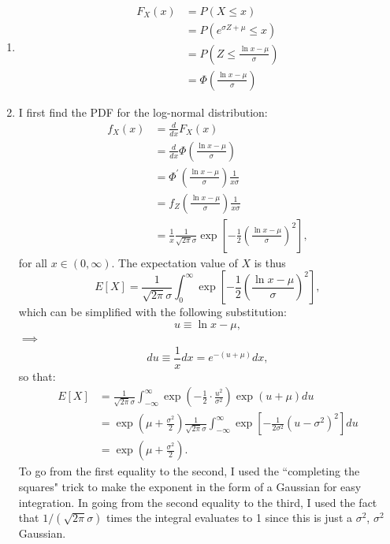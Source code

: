 \begin{problem}{22}$ $
\begin{enumerate}

\item

	\begin{align*}
	F_X(x) & = P(X\le x) \\
	& = P(e^{\sigma Z+\mu}\le x) \\
		& = P\left(Z \le \frac{\ln{x}-\mu}{\sigma}\right) \\
		&=\Phi \left (\frac{\ln{x}-\mu}{\sigma} \right)
	\end{align*}
	
\item  I first find the PDF for the log-normal distribution:
		\begin{align*}
	f_X(x) & = \frac{d}{dx} F_X(x) \\
	& = \frac{d}{dx} \Phi \left (\frac{\ln{x}-\mu}{\sigma} \right) \\
		& = \Phi^\prime \left (\frac{\ln{x}-\mu}{\sigma} \right) \frac{1}{x\sigma} \\
		&=f_Z \left (\frac{\ln{x}-\mu}{\sigma} \right) \frac{1}{x\sigma} \\
		& = \frac{1}{x}\frac{1}{\sqrt{2 \pi} \sigma}\exp{\left[-\frac{1}{2} \left(\frac{\ln{x}-\mu}{\sigma} \right)^2\right]},
	\end{align*}
for all $x \in (0, \infty)$.  The expectation value of $X$ is thus
\begin{equation*}
E[X] = \frac{1}{\sqrt{2 \pi} \sigma}\int_0^\infty \exp{\left[-\frac{1}{2} \left(\frac{\ln{x}-\mu}{\sigma} \right)^2\right]},
 \end{equation*}
 which can be simplified with the following substitution:
 \begin{equation*}
u \equiv \ln{x}-\mu,
 \end{equation*}
 $\implies$
  \begin{equation*}
du \equiv \frac{1}{x}dx = e^{-(u+\mu)}dx,
 \end{equation*}
 so that:
 \begin{align*}
E[X] &= \frac{1}{\sqrt{2 \pi} \sigma}\int_{-\infty}^\infty \exp{\left(-\frac{1}{2} \cdot \frac{u^2}{\sigma^2}\right)} \exp{(u+\mu)}du \\
& =  \exp{\left(\mu+\frac{\sigma^2}{2} \right)} \frac{1}{\sqrt{2 \pi} \sigma}\int_{-\infty}^\infty \exp{\left[-\frac{1}{2 \sigma^2} (u-\sigma^2)^2 \right]}du \\
& =\exp{\left(\mu+\frac{\sigma^2}{2} \right)}.
 \end{align*}
 To go from the first equality to the second, I used the ``completing the squares" trick to make the exponent in the form of a Gaussian for easy integration.  In going from the second equality to the third, I used the fact that $1/(\sqrt{2 \pi} \sigma)$ times the integral evaluates to 1 since this is just a $\sigma^2$, $\sigma^2$ Gaussian.
 

\end{enumerate}
\end{problem}
